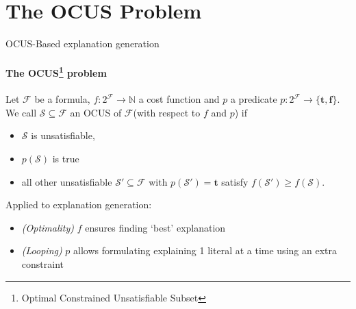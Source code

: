 \documentclass{beamer}
\newcommand\m[1]{\ensuremath{\mathcal{#1}}\xspace}
\newcommand\formula{\ensuremath{\m{F} }\xspace}
\renewcommand\emph[1]{{\color{vuborange}#1}}
\newcommand\nat{\m{\mathbb{N}}}
\newcommand\subsetT{\m{\mathcal{S}}}
\newcommand\ltrue{\m{\textbf{t}}}
\newcommand\lfalse{\m{\textbf{f}}}
\begin{document}
	
	
	
	\section{The OCUS Problem}
	
	 \begin{frame}
		\tableofcontents[currentsection]
	\end{frame}			
	
			\begin{frame}{OCUS-Based explanation generation}
			\framesubtitle{The OCUS\footnote{Optimal \emph{Constrained} Unsatisfiable Subset} problem}
			\begin{definition}
				\small
				Let $\formula$ be a formula, $f:2^{\formula} \to \nat$ a cost function and  $p$ a predicate $p: 2^{\formula}\to \{\ltrue,\lfalse\}$. We call %
					$\subsetT \subseteq \formula$ an \emph{OCUS}  of \formula (with respect to $f$ and $p$) if \begin{itemize}                                      
						\item $\subsetT$ is unsatisfiable,
						\item $p(\subsetT)$ is true
						\item \emph{all other unsatisfiable $\subsetT'\subseteq \formula$ with $p(\subsetT')=\ltrue$ satisfy $f(\subsetT')\geq f(\subsetT)$}.
					\end{itemize}
				\end{definition} \pause
				
				\vfill
				Applied to explanation generation: \pause
				\begin{itemize}
					\item[Q1] \textit{\emph{(Optimality)}} {\color{red}$f$} ensures finding `best' explanation \pause
					\item[Q2] \textit{\emph{(Looping)}} {\color{red}$p$} allows formulating explaining 1 literal at a time using an extra constraint
				\end{itemize}
							
			\end{frame}		
			
\end{document}
